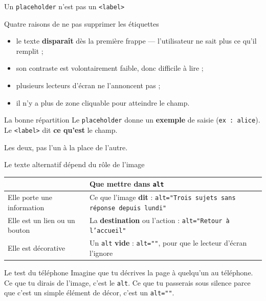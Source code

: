 \documentclass[aspectratio=169,11pt]{beamer}
\newcommand{\hdr}[1]{\multicolumn{1}{l}{\color{white}\bfseries #1}}
\begin{document}
\begin{frame}{Un \texttt{placeholder} n'est pas un \texttt{<label>}}
  \begin{alertblock}{Quatre raisons de ne pas supprimer les étiquettes}
    \begin{itemize}
      \item le texte \textbf{disparaît} dès la première frappe --- l'utilisateur ne sait plus ce qu'il remplit ;
      \item son contraste est volontairement faible, donc difficile à lire ;
      \item plusieurs lecteurs d'écran ne l'annoncent pas ;
      \item il n'y a plus de zone cliquable pour atteindre le champ.
    \end{itemize}
  \end{alertblock}
  \vspace{0.3cm}
  \begin{block}{La bonne répartition}
    Le \texttt{placeholder} donne un \textbf{exemple} de saisie (\texttt{ex : alice}).\\
    Le \texttt{<label>} dit \textbf{ce qu'est} le champ.
    \vspace{0.1cm}

    Les deux, pas l'un à la place de l'autre.
  \end{block}
\end{frame}

\begin{frame}{Le texte alternatif dépend du rôle de l'image}
  \vspace{0.15cm}
  \begin{center}
  \small
  \begin{tabularx}{\textwidth}{lX}
    \toprule
    \rowcolor{accentBlue}
    \hdr{Rôle de l'image} & \hdr{Que mettre dans \texttt{alt}} \\
    \midrule
    \rowcolor{cfptGrey}
    Elle porte une information & Ce que l'image \textbf{dit} : \texttt{alt="Trois sujets sans réponse depuis lundi"} \\
    Elle est un lien ou un bouton & La \textbf{destination} ou l'action : \texttt{alt="Retour à l'accueil"} \\
    \rowcolor{cfptGrey}
    Elle est décorative & Un \texttt{alt} \textbf{vide} : \texttt{alt=""}, pour que le lecteur d'écran l'ignore \\
    \bottomrule
  \end{tabularx}
  \end{center}
  \vspace{0.3cm}
  \begin{exampleblock}{Le test du téléphone}
    Imagine que tu décrives la page à quelqu'un au téléphone. Ce que tu dirais de l'image, c'est le \texttt{alt}. Ce que tu passerais sous silence parce que c'est un simple élément de décor, c'est un \texttt{alt=""}.
  \end{exampleblock}
\end{frame}
\end{document}
